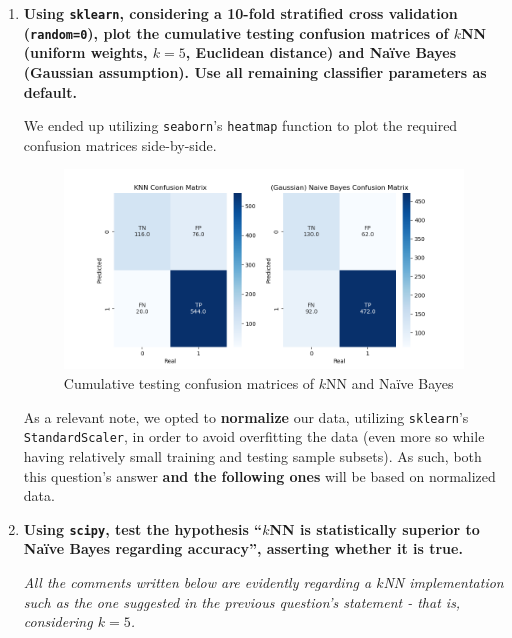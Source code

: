 \documentclass[12pt]{article}
\begin{document}
\begin{enumerate}[leftmargin=\labelsep,resume]
  \item \textbf{Using \texttt{sklearn}, considering a 10-fold stratified cross validation (\texttt{random=0}), plot the cumulative
          testing confusion matrices of $k$NN (uniform weights, $k = 5$, Euclidean distance) and Naïve Bayes
          (Gaussian assumption). Use all remaining classifier parameters as default.}

        We ended up utilizing \texttt{seaborn}'s \texttt{heatmap} function to plot the
        required confusion matrices side-by-side.

        \begin{figure}[h]
          \centering
          \includegraphics[width=\textwidth]{../assets/hw2-2.1.png}
          \caption{Cumulative testing confusion matrices of $k$NN and Naïve Bayes}
          \label{fig:fig1}
        \end{figure}

        \begin{sloppypar}
          As a relevant note, we opted to \textbf{normalize} our data, utilizing \texttt{sklearn}'s
          \texttt{StandardScaler}, in order to avoid overfitting the data (even more so while
          having relatively small training and testing sample subsets). As such, both this
          question's answer \textbf{and the following ones} will be based on normalized data.
        \end{sloppypar}

        \pagebreak

  \item \textbf{Using \texttt{scipy}, test the hypothesis “$k$NN is statistically superior to Naïve Bayes regarding
          accuracy”, asserting whether it is true.}

        \textit{All the comments written below are evidently regarding a $k$NN implementation
          such as the one suggested in the previous question's statement - that is,
          considering $k = 5$.}


\end{enumerate}
\end{document}
